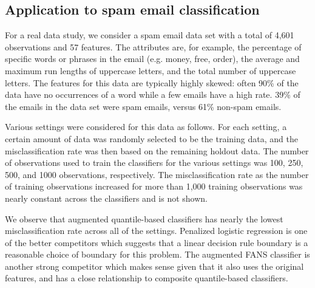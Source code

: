 \subsection{Application to spam email classification}
\label{sec:real-data-study}

For a real data study, we consider a spam email data set with a total of 4,601
observations and 57 features.  The attributes are, for example, the percentage
of specific words or phrases in the email (e.g. money, free, order), the average
and maximum run lengths of uppercase letters, and the total number of uppercase
letters.  The features for this data are typically highly skewed: often 90\% of
the data have no occurrences of a word while a few emails have a high rate.
39\% of the emails in the data set were spam emails, versus 61\% non-spam
emails.

Various settings were considered for this data as follows.  For each setting, a
certain amount of data was randomly selected to be the training data, and the
misclassification rate was then based on the remaining holdout data.  The number
of observations used to train the classifiers for the various settings was 100,
250, 500, and 1000 observations, respectively.  The misclassification rate as
the number of training observations increased for more than 1,000 training
observations was nearly constant across the classifiers and is not shown.

We observe that augmented quantile-based classifiers has nearly the lowest
misclassification rate across all of the settings.  Penalized logistic
regression is one of the better competitors which suggests that a linear
decision rule boundary is a reasonable choice of boundary for this problem.  The
augmented FANS classifier is another strong competitor which makes sense given
that it also uses the original features, and has a close relationship to
composite quantile-based classifiers.




